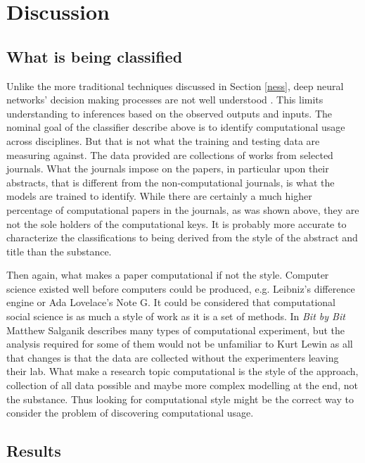 \documentclass[12pt, a4paper]{article}
\begin{document}
\section{Discussion}

\subsection{What is being classified}

Unlike the more traditional techniques discussed in Section \ref{ness}, deep neural networks' decision making processes are not well understood \citep{deep_learning_chapter12}. This limits understanding to inferences based on the observed outputs and inputs. The nominal goal of the classifier describe above is to identify computational usage across disciplines. But that is not what the training and testing data are measuring against. The data provided are collections of works from selected journals. What the journals impose on the papers, in particular upon their abstracts, that is different from the non-computational journals, is what the models are trained to identify. While there are certainly a much higher percentage of computational papers in the journals, as was shown above, they are not the sole holders of the computational keys. It is probably more accurate to characterize the classifications to being derived from the style of the abstract and title than the substance.

Then again, what makes a paper computational if not the style. Computer science existed well before computers could be produced, e.g. Leibniz's difference engine or Ada Lovelace's Note G. It could be considered that computational social science is as much a style of work as it is a set of methods. In \textit{Bit by Bit} Matthew Salganik \citep{salganik2017bit} describes many types of computational experiment, but the analysis required for some of them would not be unfamiliar to Kurt Lewin \citep{lewin1939field} as all that changes is that the data are collected without the experimenters leaving their lab. What make a research topic computational is the style of the approach, collection of all data possible and maybe more complex modelling at the end, not the substance. Thus looking for computational style might be the correct way to consider the problem of discovering computational usage.

\subsection{Results}
\end{document}
